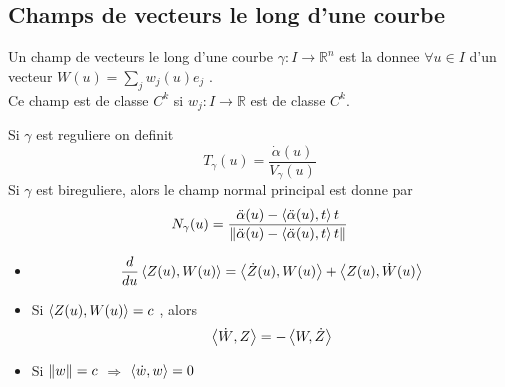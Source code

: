 \documentclass[../main.tex]{subfiles}
\begin{document}
\subsection{Champs de vecteurs le long d'une courbe}
\begin{defn}
	Un champ de vecteurs le long d'une courbe $\gamma: I \to \mathbb{R}^{n}$ est la donnee $\forall u \in I$ d'un vecteur $W( u) =\sum_j  w_j( u) e_j $ .\\
	Ce champ est de classe $C^{k}$ si $w_j: I \to \mathbb{R}$ est de classe $C^{k}$.
\end{defn}
\begin{defn}
	Si $\gamma$ est reguliere on definit
	\[ 
		T_\gamma ( u) = \frac{\dot { \alpha} ( u) }{V_{\gamma} ( u) }
	\]
Si $\gamma$ est bireguliere, alors le champ normal principal est donne par
\[ 
N_{\gamma} ( u) = \frac{\ddot { \alpha} ( u) - \left\langle \ddot { \alpha} ( u) , t\right\rangle t}{\left\lVert \ddot { \alpha} ( u) - \left\langle \ddot { \alpha} ( u) , t\right\rangle t\right\rVert}
\]
		
\end{defn}
\begin{propo}
\begin{itemize}
\item 
	\[ 
		\frac{d}{du}\left\langle Z( u) , W( u) \right\rangle = \left\langle \dot { Z} ( u) ,   W ( u) \right\rangle  + \left\langle Z( u) , \dot { W} ( u) \right\rangle 
	\]
	
\end{itemize}

\end{propo}
\begin{crly}
\begin{itemize}
	\item Si $\left\langle Z( u) , W( u) \right\rangle = c$ , alors
\[ 
	\left\langle \dot { W} ,Z \right\rangle = - \left\langle W, \dot{Z}\right\rangle 
\]
\item Si $\left\lVert w\right\rVert =c$ $\Rightarrow$ $\left\langle \dot w, w\right\rangle =0$ 

\end{itemize}

\end{crly}
	
		
		
	
			
\end{document}
